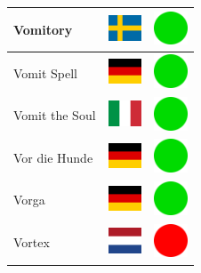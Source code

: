 \documentclass[12pt, a4paper, twoside]{report}
\begin{document}
\begin{center}
\begin{longtable}{|p{5cm}|p{2cm}|p{2cm}|}
 Vomitory                                                   & \includegraphics[width=1cm]{../4x3/se} &   \includegraphics[width=1cm]{../likes/y} \\ \hline
 Vomit Spell                                                & \includegraphics[width=1cm]{../4x3/de} &   \includegraphics[width=1cm]{../likes/y} \\ \hline
 Vomit the Soul                                             & \includegraphics[width=1cm]{../4x3/it} &   \includegraphics[width=1cm]{../likes/y} \\ \hline
 Vor die Hunde                                              & \includegraphics[width=1cm]{../4x3/de} &   \includegraphics[width=1cm]{../likes/y} \\ \hline
 Vorga                                                      & \includegraphics[width=1cm]{../4x3/de} &   \includegraphics[width=1cm]{../likes/y} \\ \hline
 Vortex                                                     & \includegraphics[width=1cm]{../4x3/nl} &   \includegraphics[width=1cm]{../likes/n} \\ \hline

\end{longtable}
\end{center}
\end{document}
